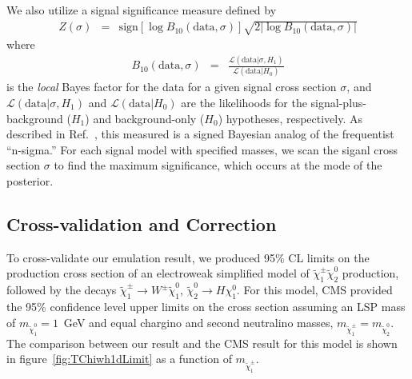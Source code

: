 We also utilize a signal significance measure defined by
\begin{eqnarray}
Z(\sigma) &=& \mathrm{sign}[\log B_{10}(\mathrm{data},\sigma)]\sqrt{2|\log B_{10}(\mathrm{data},\sigma)|}
\label{eqn:zSig}
\end{eqnarray}
where 
\begin{eqnarray}
B_{10}(\mathrm{data},\sigma) &=& \frac{\mathcal L(\mathrm{data}
  |\sigma,H_1)}{\mathcal L(\mathrm{data}
  |H_0)}
\label{eqn:localBayes}
\end{eqnarray}
is the \emph{local} Bayes factor for the data for a given signal cross
section $\sigma$, and $\mathcal L(\mathrm{data}
  |\sigma,H_1)$ and $\mathcal L(\mathrm{data}
  |H_0)$ are the likelihoods for the signal-plus-background ($H_1$) and
  background-only ($H_0$) hypotheses, respectively. As described in
  Ref.~\cite{CMS-PAS-SUS-15-010}, this
  measured is a signed Bayesian analog of the frequentist ``n-sigma.''
  For each signal model with specified masses, we scan the siganl
  cross section $\sigma$ to find the maximum significance,
  which occurs at the mode of the posterior.
\subsection{Cross-validation and Correction}
To cross-validate our emulation result, we produced 95\% CL
limits on the production cross section of an electroweak simplified
model of $\tilde{\chi}_1^{\pm}\tilde{\chi}_2^0$ production, followed by
the decays $\tilde{\chi}_1^{\pm}\to W^{\pm}\tilde\chi_1^0$,
$\tilde{\chi}_2^0\to H\chi_1^0$. For this model, CMS provided the 95\%
confidence level upper limits on the cross section assuming an LSP mass of
$m_{\tilde\chi_1^0}=1$~GeV and equal chargino and second neutralino
masses, $m_{\tilde{\chi}_1^{\pm}}=m_{\tilde{\chi}_2^0}$. 
The comparison between our result and the CMS result for this model is shown in
figure~\ref{fig:TChiwh1dLimit} as a function of $m_{\tilde{\chi}_1^{\pm}}$.


